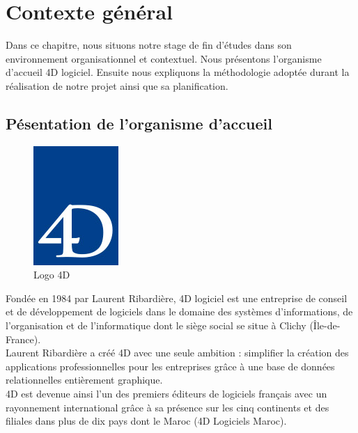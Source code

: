\chapter{Contexte général}
\label{chap:Contexte général}



Dans ce chapitre, nous situons notre stage de fin d’études dans son environnement organisationnel et contextuel. Nous présentons l’organisme d’accueil 4D logiciel. Ensuite nous expliquons la méthodologie adoptée durant la réalisation de notre projet ainsi que sa planification.

\newpage


\section{Pésentation de l’organisme d’accueil}

\begin{figure}[h]
    \centering
    \includegraphics[scale=0.5]{Logos/Logo-4D.jpg} %
    \caption{Logo 4D}
    \label{fig:Logo4D}
\end{figure}

Fondée en 1984 par Laurent Ribardière, 4D logiciel est une entreprise de conseil et de
développement de logiciels dans le domaine des systèmes d’informations, de l’organisation
et de l’informatique dont le siège social se situe à Clichy (Île-de-France).\\

Laurent Ribardière a créé 4D avec une seule ambition : simplifier la création des
applications professionnelles pour les entreprises grâce à une base de données relationnelles
entièrement graphique.\\

4D est devenue ainsi l’un des premiers éditeurs de logiciels français avec un rayonnement international grâce à sa présence sur les cinq continents et des filiales dans plus de
dix pays dont le Maroc (4D Logiciels Maroc).\\

